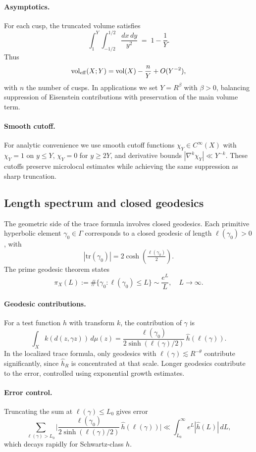 \paragraph{Asymptotics.}
For each cusp, the truncated volume satisfies
\[
\int_1^Y \int_{-1/2}^{1/2} \frac{dx\,dy}{y^2} \;=\; 1-\frac{1}{Y}.
\]
Thus
\[
\operatorname{vol}_{\mathrm{eff}}(X;Y) = \operatorname{vol}(X) - \frac{n}{Y} + O(Y^{-2}),
\]
with $n$ the number of cusps. In applications we set $Y=R^\beta$ with $\beta>0$, balancing suppression of Eisenstein contributions with preservation of the main volume term.

\paragraph{Smooth cutoff.}
For analytic convenience we use smooth cutoff functions $\chi_Y \in C^\infty(X)$ with $\chi_Y=1$ on $y\le Y$, $\chi_Y=0$ for $y\ge 2Y$, and derivative bounds $|\nabla^k \chi_Y|\ll Y^{-k}$. These cutoffs preserve microlocal estimates while achieving the same suppression as sharp truncation.

\subsection{Length spectrum and closed geodesics}\label{subsec:geodesics}

The geometric side of the trace formula involves closed geodesics. Each primitive hyperbolic element $\gamma_0 \in \Gamma$ corresponds to a closed geodesic of length $\ell(\gamma_0)>0$, with
\[
|\mathrm{tr}(\gamma_0)| = 2\cosh(\tfrac{\ell(\gamma_0)}{2}).
\]
The prime geodesic theorem states
\[
\pi_X(L) := \#\{\gamma_0 : \ell(\gamma_0)\le L\} \sim \frac{e^L}{L}, \quad L\to\infty.
\]

\paragraph{Geodesic contributions.}
For a test function $h$ with transform $k$, the contribution of $\gamma$ is
\[
\int_X k(d(z,\gamma z))\,d\mu(z) = \frac{\ell(\gamma_0)}{2\sinh(\ell(\gamma)/2)}\,\widehat{h}(\ell(\gamma)).
\]
In the localized trace formula, only geodesics with $\ell(\gamma)\lesssim R^{-\theta}$ contribute significantly, since $\widehat{h}_R$ is concentrated at that scale. Longer geodesics contribute to the error, controlled using exponential growth estimates.

\paragraph{Error control.}
Truncating the sum at $\ell(\gamma)\le L_0$ gives error
\[
\sum_{\ell(\gamma)>L_0} \Bigg|\frac{\ell(\gamma_0)}{2\sinh(\ell(\gamma)/2)}\,\widehat{h}(\ell(\gamma))\Bigg| \ll \int_{L_0}^\infty e^L|\widehat{h}(L)|\,dL,
\]
which decays rapidly for Schwartz-class $h$.


